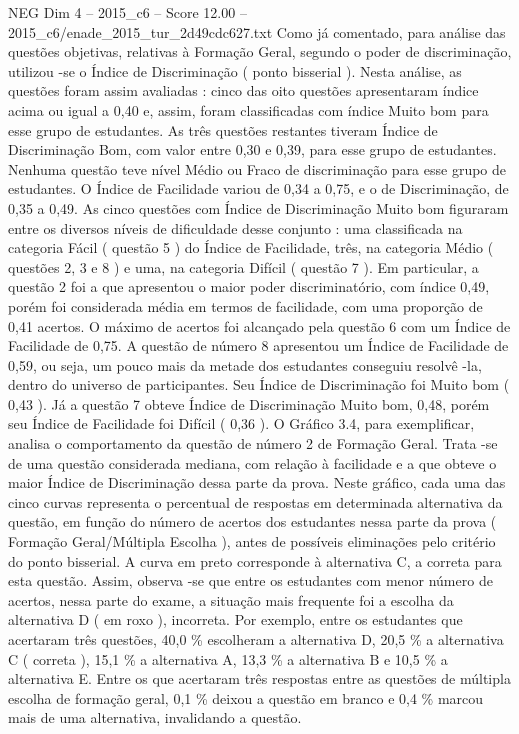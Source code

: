 \begin{textsample}{NEG Dim 4 – 2015\_c6 – Score 12.00 – 2015\_c6/enade\_2015\_tur\_2d49cdc627.txt}
Como já comentado, para análise das questões objetivas, relativas à Formação Geral, segundo o poder de discriminação, utilizou -se o Índice de Discriminação ( ponto bisserial ).
Nesta análise, as questões foram assim avaliadas : cinco das oito questões apresentaram índice acima ou igual a 0,40 e, assim, foram classificadas com índice Muito bom para esse grupo de estudantes.
As três questões restantes tiveram Índice de Discriminação Bom, com valor entre 0,30 e 0,39, para esse grupo de estudantes.
Nenhuma questão teve nível Médio ou Fraco de discriminação para esse grupo de estudantes.
O Índice de Facilidade variou de 0,34 a 0,75, e o de Discriminação, de 0,35 a 0,49.
As cinco questões com Índice de Discriminação Muito bom figuraram entre os diversos níveis de dificuldade desse conjunto : uma classificada na categoria Fácil ( questão 5 ) do Índice de Facilidade, três, na categoria Médio ( questões 2, 3 e 8 ) e uma, na categoria Difícil ( questão 7 ).
Em particular, a questão 2 foi a que apresentou o maior poder discriminatório, com índice 0,49, porém foi considerada média em termos de facilidade, com uma proporção de 0,41 acertos.
O máximo de acertos foi alcançado pela questão 6 com um Índice de Facilidade de 0,75.
A questão de número 8 apresentou um Índice de Facilidade de 0,59, ou seja, um pouco mais da metade dos estudantes conseguiu resolvê -la, dentro do universo de participantes.
Seu Índice de Discriminação foi Muito bom ( 0,43 ).
Já a questão 7 obteve Índice de Discriminação Muito bom, 0,48, porém seu Índice de Facilidade foi Difícil ( 0,36 ).
O Gráfico 3.4, para exemplificar, analisa o comportamento da questão de número 2 de Formação Geral.
Trata -se de uma questão considerada mediana, com relação à facilidade e a que obteve o maior Índice de Discriminação dessa parte da prova.
Neste gráfico, cada uma das cinco curvas representa o percentual de respostas em determinada alternativa da questão, em função do número de acertos dos estudantes nessa parte da prova ( Formação Geral/Múltipla Escolha ), antes de possíveis eliminações pelo critério do ponto bisserial.
A curva em preto corresponde à alternativa C, a correta para esta questão.
Assim, observa -se que entre os estudantes com menor número de acertos, nessa parte do exame, a situação mais frequente foi a escolha da alternativa D ( em roxo ), incorreta.
Por exemplo, entre os estudantes que acertaram três questões, 40,0 \% escolheram a alternativa D, 20,5 \% a alternativa C ( correta ), 15,1 \% a alternativa A, 13,3 \% a alternativa B e 10,5 \% a alternativa E.
Entre os que acertaram três respostas entre as questões de múltipla escolha de formação geral, 0,1 \% deixou a questão em branco e 0,4 \% marcou mais de uma alternativa, invalidando a questão.

\end{textsample}
